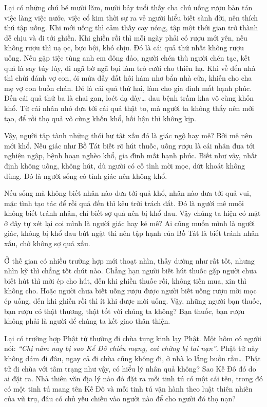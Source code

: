 \documentclass[
  12pt,
  oneside]{book}
\begin{document}
Lại có những chú bé mười lăm, mười bảy tuổi thấy cha chú uống rượu bàn tán việc làng việc nước, việc cổ kim thời sự ra vẻ người hiểu biết sành đời, nên thích thú tập uống. Khi mới uống thì cảm thấy cay nóng, tập một thới gian trở thành dễ chịu và đi tới ghiền. Khi ghiền rồi thì mỗi ngày phải có rượu mới yên, nếu không rượu thì uạ ọc, bực bội, khó chịu. Đó là cái quả thứ nhất không rượu uống. Nếu gặp tiệc tùng anh em đông đảo, người chén thù người chén tạc, kết quả là say túy lúy, đi ngã bờ ngã bụi làm trò cười cho thiên hạ. Khi về đến nhà thì chửi đánh vợ con, ói mửa đầy đất hôi hám nhơ bẩn nhà cửa, khiến cho cha mẹ vợ con buồn chán. Đó là cái quả thứ hai, làm cho gia đình mất hạnh phúc. Đến cái quả thứ ba là chai gan, loét dạ dày\ldots{} đau bệnh trầm kha vô cùng khốn khổ. Từ cái nhân nhỏ đưa tới cái quả thật to, mà người ta không thấy nên mới tạo, để rồi thọ quả vô cùng khốn khổ, hối hận thì không kịp.

Vậy, người tập tành những thói hư tật xấu đó là giác ngộ hay mê? Bởi mê nên mới khổ. Nếu giác như Bồ Tát biết rõ hút thuốc, uống rượu là cái nhân đưa tới nghiện ngập, bệnh hoạn nghèo khổ, gia đình mất hạnh phúc. Biết như vậy, nhất định không uống, không hút, dù người có cố tình mời mọc, dứt khoát không dùng. Đó là người sống có tỉnh giác nên không khổ.

Nếu sống mà không biết nhân nào đưa tới quả khổ, nhân nào đưa tới quả vui, mặc tình tạo tác để rồi quả đến thì kêu trời trách đất. Đó là người mê muội không biết tránh nhân, chỉ biết sợ quả nên bị khổ đau. Vậy chúng ta hiện có mặt ở đây tự xét lại coi mình là người giác hay kẻ mê? Ai cũng muốn mình là người giác, không bị khổ đau bứt ngặt thì nên tập hạnh của Bồ Tát là biết tránh nhân xấu, chớ không sợ quả xấu.

Ở thế gian có nhiều trường hợp mới thoạt nhìn, thấy dường như rất tốt, nhưng nhìn kỹ thì chẳng tốt chút nào. Chẳng hạn người biết hút thuốc gặp người chưa biết hút thì mời ép cho hút, đến khi ghiền thuốc rồi, không tiền mua, xin thì không cho. Hoặc người chưa biết uống rượu được người biết uống rượu mời mọc ép uống, đến khi ghiền rồi thì ít khi được mời uống. Vậy, những người bạn thuốc, bạn rượu có thật thương, thật tốt với chúng ta không? Bạn thuốc, bạn rượu không phải là người để chúng ta kết giao thân thiện.

Lại có trường hợp Phật tử thường đi chùa tụng kinh lạy Phật. Một hôm có người nói: \emph{``Chị năm nay bị sao Kế Đô chiếu mạng, coi chừng bị tai nạn''}. Phật tử này không dám đi đâu, ngay cả đi chùa cũng không đi, ở nhà lo lắng buồn rầu\ldots{} Phật tử đi chùa với tâm trạng như vậy, có hiểu lý nhân quả không? Sao Kế Đô đó do ai đặt ra. Nhà thiên văn địa lý nào đó đặt ra mỗi tinh tú có một cái tên, trong đó có một tinh tú mang tên Kế Đô và mỗi tinh tú vận hành theo luật thiên nhiên của vũ trụ, đâu có chủ yếu chiếu vào người nào để cho người đó thọ nạn?
\end{document}

